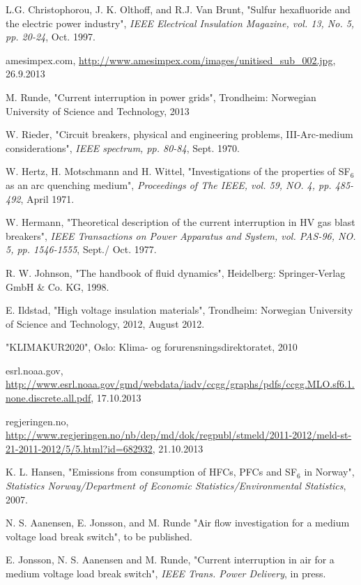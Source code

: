 \documentclass[10pt,a4paper,twoside]{article}
\begin{document}
\cleardoublepage
\begin{thebibliography}{10}
 L.G. Christophorou, J. K. Olthoff, and R.J. Van Brunt, "Sulfur hexafluoride and the electric power industry", \textit{IEEE Electrical Insulation Magazine, vol. 13, No. 5, pp. 20-24}, Oct. 1997.

 amesimpex.com, \url{http://www.amesimpex.com/images/unitised_sub_002.jpg}, 26.9.2013

 M. Runde, "Current interruption in power grids", Trondheim: Norwegian University of Science and Technology, 2013

 W. Rieder, "Circuit breakers, physical and engineering problems, III-Arc-medium considerations", \textit{IEEE spectrum, pp. 80-84}, Sept. 1970.

 W. Hertz, H. Motschmann and H. Wittel, "Investigations of the properties of SF$_6$ as an arc quenching medium", \textit{Proceedings of The IEEE, vol. 59, NO. 4, pp. 485-492}, April 1971.

 W. Hermann, "Theoretical description of the current interruption in HV gas blast breakers", \textit{IEEE Transactions on Power Apparatus and System, vol. PAS-96, NO. 5, pp. 1546-1555}, Sept./ Oct. 1977.

 R. W. Johnson, "The handbook of fluid dynamics", Heidelberg: Springer-Verlag GmbH \& Co. KG, 1998.

 E. Ildstad, "High voltage insulation materials", Trondheim: Norwegian University of Science and Technology, 2012, August 2012.

 "KLIMAKUR2020", Oslo: Klima- og forurensningsdirektoratet, 2010

 esrl.noaa.gov, \url{http://www.esrl.noaa.gov/gmd/webdata/iadv/ccgg/graphs/pdfs/ccgg.MLO.sf6.1.none.discrete.all.pdf}, 17.10.2013

 regjeringen.no, \url{http://www.regjeringen.no/nb/dep/md/dok/regpubl/stmeld/2011-2012/meld-st-21-2011-2012/5/5.html?id=682932}, 21.10.2013

 K. L. Hansen, "Emissions from consumption of HFCs, PFCs and SF$_6$ in Norway", \textit{Statistics Norway/Department of Economic Statistics/Environmental Statistics}, 2007.

 N. S. Aanensen, E. Jonsson, and M. Runde "Air flow investigation for a medium voltage load break switch", to be published.

 E. Jonsson, N. S. Aanensen and M. Runde, "Current interruption in air for a medium voltage load break switch", \textit{IEEE Trans. Power Delivery}, in press.

\end{thebibliography}
\end{document}
